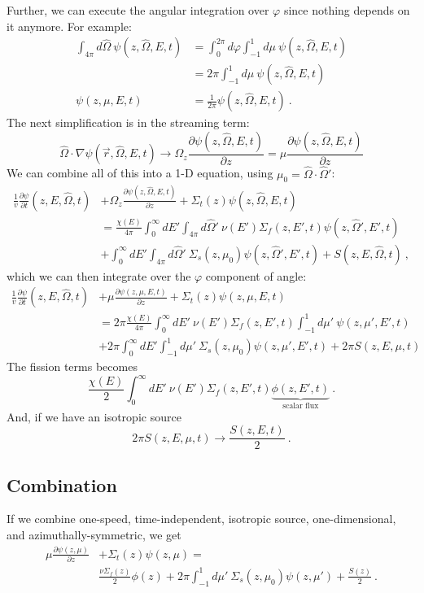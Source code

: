 \documentclass[12pt]{article}
\newcommand{\omvec}{\ensuremath{\hat{\Omega}}}
\newcommand{\vOmega}{\ensuremath{\hat{\Omega}}}
\begin{document}
Further, we can execute the angular integration over $\varphi$ since nothing depends on it anymore. For example:
\begin{align*}
\int_{4 \pi} d\vOmega\: \psi(z, \vOmega, E, t) &=   \int_0^{2\pi} d\varphi \int_{-1}^1 d\mu \:\psi(z, \vOmega, E, t) \\
&= 2 \pi \int_{-1}^1 d\mu \:\psi(z, \vOmega, E, t)\\
\psi(z, \mu, E, t) &= \frac{1}{2 \pi}\psi(z, \vOmega, E, t)\:.
\end{align*}
%
The next simplification is in the streaming term:
\[\vOmega \cdot \nabla \psi(\vec{r}, \vOmega, E, t) \rightarrow \Omega_z \frac{\partial \psi(z, \vOmega, E, t)}{\partial z} = \mu \frac{\partial \psi(z, \vOmega, E, t)}{\partial z} \]
%
We can combine all of this into a 1-D equation, using $\mu_0 = \vOmega \cdot \vOmega'$:
\begin{align*}
\frac{1}{v}\frac{\partial \psi}{\partial t}(z,E,\omvec,t) &+ \Omega_z \frac{\partial \psi(z, \vOmega, E, t)}{\partial z} + \Sigma_t(z)\psi(z, \vOmega, E, t)  \\
&= \frac{\chi(E)}{4 \pi} \int_0^{\infty} dE'\int_{4 \pi} d\vOmega'\:  \nu(E')\Sigma_f(z,E',t)\psi(z, \vOmega', E', t)  \\
&+ \int_0^{\infty} dE' \int_{4 \pi} d\vOmega'\: \Sigma_s(z, \mu_0)\psi(z, \vOmega', E', t) + S(z, E, \vOmega, t)\:,
\end{align*}
%
which we can then integrate over the $\varphi$ component of angle:
\begin{align*}
\frac{1}{v}\frac{\partial \psi}{\partial t}(z,E,\omvec,t) &+ \mu \frac{\partial \psi(z, \mu, E, t)}{\partial z} + \Sigma_t(z)\psi(z, \mu, E, t) \\
&= 2\pi\frac{\chi(E)}{4 \pi} \int_0^{\infty} dE' \: \nu(E')\Sigma_f(z,E',t) \int_{-1}^1 d\mu'\: \psi(z, \mu', E', t) \\
&+ 2\pi\int_0^{\infty} dE' \int_{-1}^1 d\mu'\: \Sigma_s(z, \mu_0)\psi(z, \mu', E', t)  + 2\pi S(z, E, \mu, t)
\end{align*}
%
The fission terms becomes
\[\frac{\chi(E)}{2} \int_0^{\infty} dE'\:  \nu(E')\Sigma_f(z,E',t)\underbrace{\phi(z, E', t)}_{\text{scalar flux}}\:. \]
And, if we have an isotropic source
\[2\pi S(z, E, \mu, t) \rightarrow \frac{S(z, E, t)}{2}\:. \]

\subsection*{Combination}
If we combine one-speed, time-independent, isotropic source, one-dimensional, and azimuthally-symmetric, we get
\begin{align*}
\mu \frac{\partial \psi(z, \mu)}{\partial z} &+ \Sigma_t(z)\psi(z, \mu) = \\
&\frac{\nu\Sigma_f(z) }{2}\phi(z) + 2\pi\int_{-1}^1 d\mu'\: \Sigma_s(z, \mu_0)\psi(z, \mu')  + \frac{S(z)}{2} \:.
\end{align*}
\end{document}
